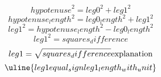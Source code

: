 \[ {hypotenuse}^{2}={leg0}^{2}+{leg1}^{2} \]
\[ {hypotenuse_length}^{2}={leg0_length}^{2}+{leg1}^{2} \]
\[ {leg1}^{2}={hypotenuse_length}^{2}-{leg0_length}^{2} \]
\[ {leg1}^{2}={squares_difference} \]
\[ {leg1}=\sqrt{\mathstrut {squares_difference}}\text{{explanation}}\]
\[ \uline{{leg1}{equal_sign}{leg1_length_with_unit}}\]